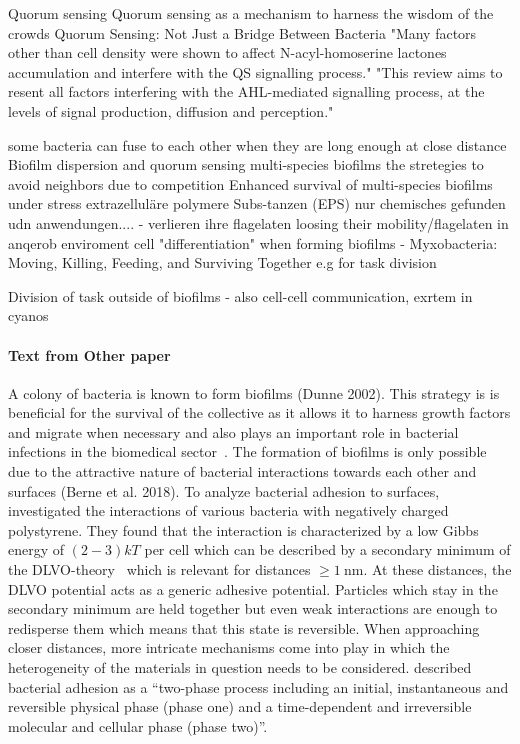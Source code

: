 \documentclass{article}
\begin{document}
Quorum sensing
\cite{MorenoGmez2023} Quorum sensing as a mechanism to harness the wisdom of the crowds
\cite{Liu2025} Quorum Sensing: Not Just a Bridge Between Bacteria
\cite{Boyer2009} "Many factors other than cell density were shown to affect N-acyl-homoserine lactones accumulation and interfere with the QS signalling process." "This review aims to resent all factors interfering with the AHL-mediated signalling process, at the levels of signal production, diffusion and perception."

some bacteria can fuse to each other when they are long enough at close distance \cite{Kudryashev2011}
Biofilm dispersion and quorum sensing \cite{Solano2014}
multi-species biofilms the stretegies to avoid neighbors due to competition \cite{Rendueles2012}
Enhanced survival of multi-species biofilms under stress \cite{Wisnu2022}
extrazelluläre polymere Subs-tanzen (EPS) nur chemisches gefunden udn anwendungen....
- verlieren ihre flagelaten loosing their mobility/flagelaten in anqerob enviroment
cell "differentiation" when forming biofilms - \cite{Lopez2010}
Myxobacteria: Moving, Killing, Feeding, and Surviving Together \cite{Jose2016} e.g for task division

Division of task outside of biofilms -  also cell-cell communication, exrtem in cyanos



\paragraph{Text from Other paper}
A colony of bacteria is known to form biofilms (Dunne 2002). This strategy is is beneficial for the
survival of the collective as it allows it to harness growth factors and migrate when necessary and
also plays an important role in bacterial infections in the biomedical sector~\cite{Ong1999}.
The formation of biofilms is only possible due to the attractive nature of bacterial interactions
towards each other and surfaces (Berne et al. 2018). To analyze bacterial adhesion to surfaces,
\cite{vanLoosdrecht1989} investigated the interactions of various bacteria with negatively charged
polystyrene.
They found that the interaction is characterized by a low Gibbs energy of $(2 - 3)kT$ per cell
which can be described by a secondary minimum of the DLVO-theory~\cite{Verwey1947,Derjaguin1993}
which is relevant for distances $\geq\SI{1}{\nano\meter}$.
At these distances, the DLVO potential acts as a generic adhesive potential.
Particles which stay in the secondary minimum are held together but even weak interactions are
enough to redisperse them which means that this state is reversible.
When approaching closer distances, more intricate mechanisms come into play in which the
heterogeneity of the materials in question needs to be considered.
\cite{Hori2010} described bacterial adhesion as a “two-phase process including an initial,
instantaneous and reversible physical phase (phase one) and a time-dependent and irreversible
molecular and cellular phase (phase two)”.
\end{document}

